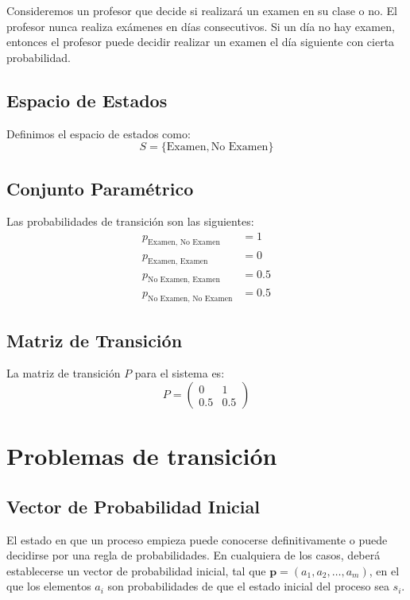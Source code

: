 \documentclass{article}
\begin{document}
Consideremos un profesor que decide si realizará un examen en su clase o no. El profesor nunca realiza exámenes en días consecutivos. Si un día no hay examen, entonces el profesor puede decidir realizar un examen el día siguiente con cierta probabilidad.

\subsection*{Espacio de Estados}
Definimos el espacio de estados como:
\[ S = \{ \text{Examen}, \text{No Examen} \} \]

\subsection*{Conjunto Paramétrico}
Las probabilidades de transición son las siguientes:
\begin{align*}
    p_{\text{Examen, No Examen}}    & = 1   \\
    p_{\text{Examen, Examen}}       & = 0   \\
    p_{\text{No Examen, Examen}}    & = 0.5 \\
    p_{\text{No Examen, No Examen}} & = 0.5
\end{align*}

\subsection*{Matriz de Transición}
La matriz de transición \( P \) para el sistema es:
\[
    P = \begin{pmatrix}
        0   & 1   \\
        0.5 & 0.5
    \end{pmatrix}
\]

\section{Problemas de transición}

\subsection{Vector de Probabilidad Inicial}

El estado en que un proceso empieza puede conocerse definitivamente o puede decidirse por una regla de probabilidades. En cualquiera de los casos, deberá establecerse un vector de probabilidad inicial, tal que \( \mathbf{p} = (a_1, a_2, \ldots, a_m) \), en el que los elementos \( a_i \) son probabilidades de que el estado inicial del proceso sea \( s_i \).
\end{document}
